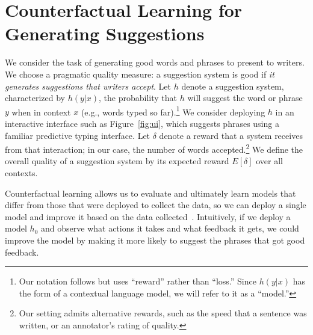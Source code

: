 \documentclass[11pt,letterpaper]{article}
\begin{document}
%
%





\section{Counterfactual Learning for Generating Suggestions}

We consider the task of generating good words and phrases to present to writers.
We choose a pragmatic quality measure: a suggestion system is good if \emph{it generates suggestions that writers accept}. Let $h$ denote a suggestion system, characterized by $h(y\vert{}x)$, the probability that $h$ will suggest the word or phrase $y$ when in context $x$ (e.g., words typed so far).\footnote{Our notation follows \citet{Swaminathan2015counterfactual} but uses ``reward'' rather than ``loss.'' Since $h(y\vert{}x)$ has the form of a contextual language model, we will refer to it as a ``model.''}
We consider deploying $h$ in an interactive interface such as Figure~\ref{fig:ui}, which suggests phrases using a familiar predictive typing interface. Let $\delta$ denote a reward that a system receives from that interaction; in our case, the number of words accepted.\footnote{Our setting admits alternative rewards, such as the speed that a sentence was written, or an annotator's rating of quality.} We define the overall quality of a suggestion system by its expected reward $E[\delta]$ over all contexts.

%

Counterfactual learning allows us to evaluate and ultimately learn models that differ from those that were deployed to collect the data, so we can deploy a single model and improve it based on the data collected~\cite{Swaminathan2015counterfactual}.
Intuitively, if we deploy a model $h_0$ and observe what actions it takes and what feedback it gets, we could improve the model by making it more likely to suggest the phrases that got good feedback.
%
%
\end{document}
